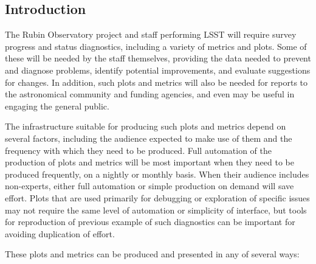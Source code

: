 \subsection{Introduction}
\label{sec:org9bf6266}
The Rubin Observatory project and staff performing LSST will require survey progress and status diagnostics, including a variety of metrics and plots.
Some of these will be needed by the staff themselves, providing the data needed to prevent and diagnose problems, identify potential improvements, and evaluate suggestions for changes.
In addition, such plots and metrics will also be needed for reports to the astronomical community and funding agencies, and even may be useful in engaging the general public.

The infrastructure suitable for producing such plots and metrics depend on several factors, including the audience expected to make use of them and the frequency with which they need to be produced.
Full automation of the production of plots and metrics will be most important when they need to be produced frequently, on a nightly or monthly basis.
When their audience includes non-experts, either full automation or simple production on demand will save effort.
Plots that are used primarily for debugging or exploration of specific issues may not require the same level of automation or simplicity of interface, but tools for reproduction of previous example of such diagnostics can be important for avoiding duplication of effort.

These plots and metrics can be produced and presented in any of several ways:

